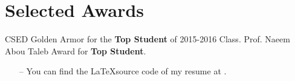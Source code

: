 \documentclass[letterpaper]{twentysecondcv} %
\begin{document}

\section{Selected Awards}

\begin{twentyshort}
	       {CSED Golden Armor for the \textbf{Top Student} of 2015-2016 Class.}
	       {Prof. Naeem Abou Taleb Award for \textbf{Top Student}.}
\end{twentyshort}

\vfill
\footnotesize{
\begin{itemize}[leftmargin=10px]
    \item[--] You can find the \LaTeX source code of my resume at .
\end{itemize}
}
\end{document}
